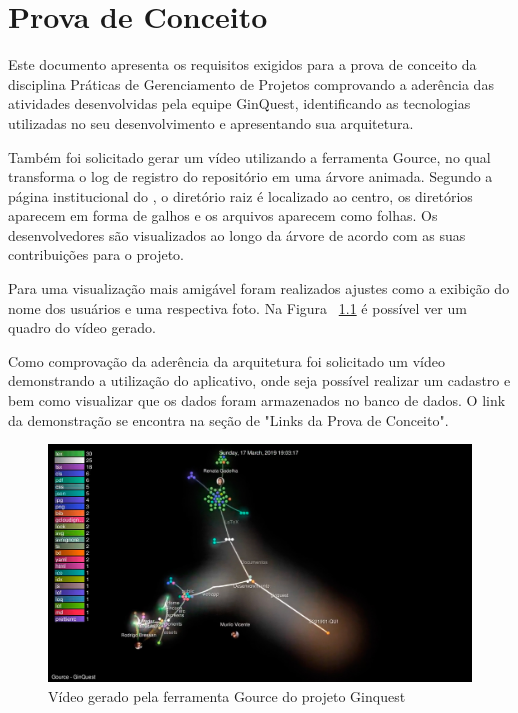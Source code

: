 \documentclass[
    12pt,               %
    openright,          %
    twoside,            %
    a4paper,            %
    openany             %
    draft,              %
    MODELO,             %
    TODO,               %
    english,            %
    brazil              %
    ]{ifsp-spo-inf-ctds}
\begin{document}
\frenchspacing 

\pretextual

\imprimirfolhaderosto

\textual

{\let\clearpage\relax\par \chapter{Prova de Conceito}}

Este documento apresenta os requisitos exigidos para a prova de conceito da disciplina Práticas de Gerenciamento de Projetos comprovando a aderência das atividades desenvolvidas pela equipe GinQuest, identificando as tecnologias utilizadas no seu desenvolvimento e apresentando sua arquitetura.

Também foi solicitado gerar um vídeo utilizando a ferramenta Gource, no qual transforma o log de registro do repositório em uma árvore animada. Segundo a página institucional do , o diretório raiz é localizado ao centro, os diretórios aparecem em forma de galhos e os arquivos aparecem como folhas. Os desenvolvedores são visualizados ao longo da árvore de acordo com as suas contribuições para o projeto.

Para uma visualização mais amigável foram realizados ajustes como a exibição do nome dos usuários e uma respectiva foto. Na Figura ~\ref{fig:gource} é possível ver um quadro do vídeo gerado.

Como comprovação da aderência da arquitetura foi solicitado um vídeo demonstrando a utilização do aplicativo, onde seja possível realizar um cadastro e bem como visualizar que os dados foram armazenados no banco de dados. O link da demonstração se encontra na seção de "Links da Prova de Conceito".

\begin{figure}
\caption{Vídeo gerado pela ferramenta Gource do projeto Ginquest}
\begin{center}
\includegraphics[scale=0.15]{images/poc/poc_gource.jpg}
\end{center}
\label{fig:gource}
\end{figure}
\end{document}
